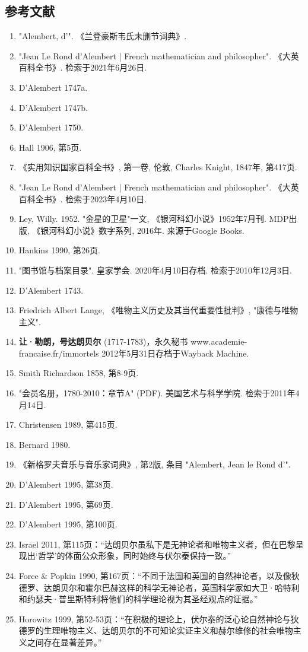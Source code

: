 \subsection{参考文献}
\begin{enumerate}
\item  "Alembert, d'". 《兰登豪斯韦氏未删节词典》.
\item  "Jean Le Rond d'Alembert | French mathematician and philosopher". 《大英百科全书》. 检索于2021年6月26日.
\item  D'Alembert 1747a.
\item  D'Alembert 1747b.
\item  D'Alembert 1750.
\item  Hall 1906, 第5页.
\item  《实用知识国家百科全书》, 第一卷, 伦敦, Charles Knight, 1847年, 第417页.
\item  "Jean Le Rond d'Alembert | French mathematician and philosopher". 《大英百科全书》. 检索于2023年4月10日.
\item  Ley, Willy. 1952. "金星的卫星"一文, 《银河科幻小说》1952年7月刊. MDP出版, 《银河科幻小说》数字系列, 2016年. 来源于Google Books.
\item  Hankins 1990, 第26页.
\item  "图书馆与档案目录". 皇家学会. 2020年4月10日存档. 检索于2010年12月3日.
\item  D'Alembert 1743.
\item  Friedrich Albert Lange, 《唯物主义历史及其当代重要性批判》, "康德与唯物主义".
\item  \textbf{让·勒朗，号达朗贝尔} (1717-1783)，永久秘书 www.academie-francaise.fr/immortels 2012年5月31日存档于Wayback Machine.
\item  Smith Richardson 1858, 第8-9页.
\item  "会员名册，1780-2010：章节A" (PDF). 美国艺术与科学学院. 检索于2011年4月14日.
\item  Christensen 1989, 第415页.
\item  Bernard 1980.
\item  《新格罗夫音乐与音乐家词典》, 第2版, 条目 "Alembert, Jean le Rond d'".
\item  D'Alembert 1995, 第38页.
\item  D'Alembert 1995, 第69页.
\item  D'Alembert 1995, 第100页.
\item  Israel 2011, 第115页：“达朗贝尔虽私下是无神论者和唯物主义者，但在巴黎呈现出‘哲学’的体面公众形象，同时始终与伏尔泰保持一致。”
\item  Force & Popkin 1990, 第167页：“不同于法国和英国的自然神论者，以及像狄德罗、达朗贝尔和霍尔巴赫这样的科学无神论者，英国科学家如大卫·哈特利和约瑟夫·普里斯特利将他们的科学理论视为其圣经观点的证据。”
\item  Horowitz 1999, 第52-53页：“在积极的理论上，伏尔泰的泛心论自然神论与狄德罗的生理唯物主义、达朗贝尔的不可知论实证主义和赫尔维修的社会唯物主义之间存在显著差异。”
\end{enumerate}
